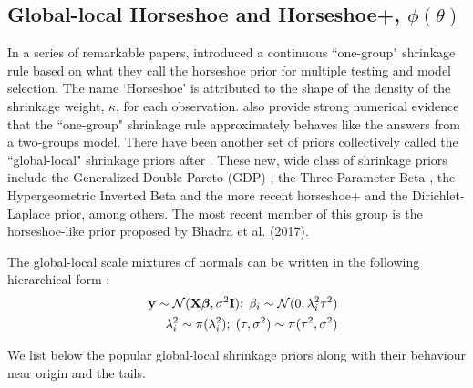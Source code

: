 \documentclass[11pt]{article}
\numberwithin{equation}{section}
\begin{document}
\subsection{Global-local Horseshoe and Horseshoe+, $ \phi(\theta)$}


In a series of remarkable papers, \citet*{carvalho2009handling, carvalho2010horseshoe, polson2010shrink, polsonscott2012} introduced a continuous ``one-group" shrinkage rule based on what they call the horseshoe prior for multiple testing and model selection. The name `Horseshoe' is attributed to the shape of the density of the shrinkage weight, $\kappa$, for each observation. \citet{carvalho2010horseshoe} also provide strong numerical evidence that the ``one-group" shrinkage rule approximately behaves like the answers from a two-groups model. There have been another set of priors collectively called the ``global-local" shrinkage priors after \cite{polson2010large}. These new, wide class of shrinkage priors include the Generalized Double Pareto (GDP) \citep{armagan2013generalized}, the Three-Parameter Beta \citep{armagan2011beta}, the Hypergeometric Inverted Beta \citep{polson2010large} and the more recent horseshoe+\citep{bhadra2016horseshoe+} and the Dirichlet-Laplace \citep{bhattacharya2014dirichlet} prior, among others. The most recent member of this group is the horseshoe-like prior proposed by Bhadra et al. (2017).

The global-local scale mixtures of normals can be written in the following hierarchical form \citep{polson2010large}: 
\begin{eqnarray*}
&&{\bf y} \sim {\cal N}({\bf X}\boldsymbol{\beta}, \sigma^2 {\bf I}) ; \; \beta_i \sim {\cal N}(0, \lambda_i^2 \tau^2) \\
&& \lambda_i^2 \sim \pi(\lambda_i^2) ; \; (\tau,\sigma^2) \sim  \pi(\tau^2,\sigma^2)
\end{eqnarray*}

We list below the popular global-local shrinkage priors along with their behaviour near origin and the tails. 
\end{document}
